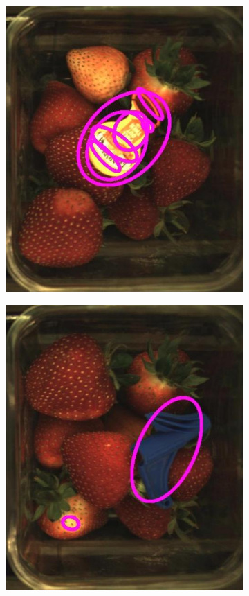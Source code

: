 \documentclass[fleqn,twoside,12pt]{report}
\begin{document}
\begin{figure}[h]
	\begin{subfigure}{.25\textwidth}
		\centering
		\includegraphics[width=.9\linewidth]{fo_4.jpg}
		\caption{}
		\label{fig:fo_4}
	\end{subfigure}%
	\begin{subfigure}{.25\textwidth}
		\centering
		\includegraphics[width=.9\linewidth]{fo_5.jpg}

\end{subfigure}
\end{figure}
\end{document}

